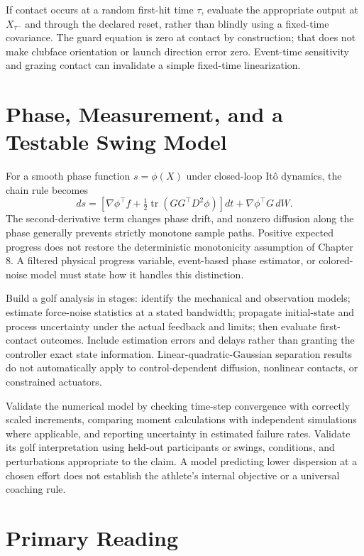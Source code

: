 If contact occurs at a random first-hit time $\tau$, evaluate the appropriate output at $X_{\tau^-}$ and through the declared reset, rather than blindly using a fixed-time covariance. The guard equation is zero at contact by construction; that does not make clubface orientation or launch direction error zero. Event-time sensitivity and grazing contact can invalidate a simple fixed-time linearization.

\section{Phase, Measurement, and a Testable Swing Model}

For a smooth phase function $s=\phi(X)$ under closed-loop Itô dynamics, the chain rule becomes
\begin{equation}
ds=\left[\nabla\phi^\top f+
\tfrac12\operatorname{tr}(GG^\top D^2\phi)\right]dt
+\nabla\phi^\top G\,dW .
\end{equation}
The second-derivative term changes phase drift, and nonzero diffusion along the phase generally prevents strictly monotone sample paths. Positive expected progress does not restore the deterministic monotonicity assumption of Chapter 8. A filtered physical progress variable, event-based phase estimator, or colored-noise model must state how it handles this distinction.

Build a golf analysis in stages: identify the mechanical and observation models; estimate force-noise statistics at a stated bandwidth; propagate initial-state and process uncertainty under the actual feedback and limits; then evaluate first-contact outcomes. Include estimation errors and delays rather than granting the controller exact state information. Linear-quadratic-Gaussian separation results do not automatically apply to control-dependent diffusion, nonlinear contacts, or constrained actuators.

Validate the numerical model by checking time-step convergence with correctly scaled increments, comparing moment calculations with independent simulations where applicable, and reporting uncertainty in estimated failure rates. Validate its golf interpretation using held-out participants or swings, conditions, and perturbations appropriate to the claim. A model predicting lower dispersion at a chosen effort does not establish the athlete's internal objective or a universal coaching rule.

\section{Primary Reading}

